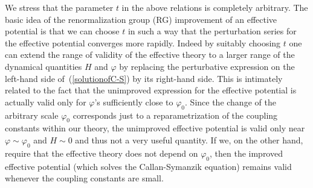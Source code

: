 We stress that the parameter $t$ in the above relations is completely
arbitrary. The basic idea of the renormalization group (RG) improvement
of an effective potential is that we can choose $t$ in such a way that
the perturbation series for the effective potential converges more
rapidly. Indeed by suitably choosing $t$ one can
extend the range of validity of the effective theory to a larger
range of the dynamical quantities $H$ and $\varphi$
by replacing the perturbative expression on the left-hand side
of~(\ref{solutionofC-S}) by its right-hand side. This is intimately related to
the fact that the unimproved expression for the effective
potential is actually valid only for $\varphi$'s sufficiently close
to $\varphi_0$. Since the change of the arbitrary scale $\varphi_0$ corresponds
just to a reparametrization of the coupling constants
within our theory, the unimproved effective potential
is valid only near $\varphi \sim \varphi_0$ and $H\sim 0$
and thus not a very useful quantity. If we, on the other
hand, require that the effective theory does
not depend on $\varphi_0$, then the improved effective potential
(which solves the Callan-Symanzik equation)
remains valid whenever the coupling constants are small.

